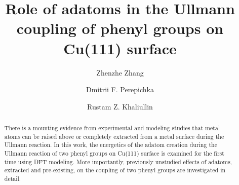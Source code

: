 \documentclass[%
 reprint,
 amsmath,amssymb,
 aps,
prb,
floatfix,
]{revtex4-2}
\begin{document}
\title{Role of adatoms in the Ullmann coupling of phenyl groups on Cu(111) surface}

\author{Zhenzhe Zhang}
\author{Dmitrii F. Perepichka}%
\author{Rustam Z. Khaliullin}
%


\begin{abstract}


There is a mounting evidence from experimental and modeling studies that metal atoms can be raised above or completely extracted from a metal surface during the Ullmann reaction. In this work, the energetics of the adatom creation during the Ullmann reaction of two phenyl groups on Cu(111) surface is examined for the first time using DFT modeling. More importantly, previously unstudied effects of adatoms, extracted and pre-existing, on the coupling of two phenyl groups are investigated in detail.
\end{abstract}

\maketitle




\end{document}
